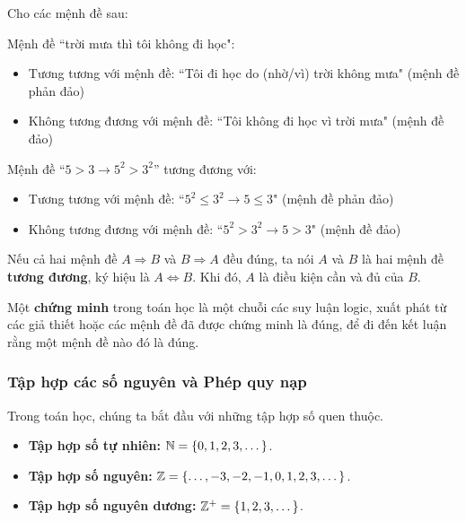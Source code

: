 \begin{example}
    Cho các mệnh đề sau:
    
    Mệnh đề ``trời mưa thì tôi không đi học":
    \begin{itemize}
        \item Tương tương với mệnh đề: ``Tôi đi học do (nhờ/vì) trời không mưa" (mệnh đề phản đảo)
        \item Không tương đương với mệnh đề: ``Tôi không đi học vì trời mưa" (mệnh đề đảo)
    \end{itemize}

    Mệnh đề ``$5 > 3 \rightarrow 5^2 > 3^2$'' tương đương với:
    \begin{itemize}
        \item Tương tương với mệnh đề: ``$5^2 \leq 3^2 \rightarrow 5 \leq 3$" (mệnh đề phản đảo)
        \item Không tương đương với mệnh đề: ``$5^2 > 3^2 \rightarrow 5 > 3$" (mệnh đề đảo)
    \end{itemize}
\end{example}

\begin{definition}
    Nếu cả hai mệnh đề $A \Rightarrow B$ và $B \Rightarrow A$ đều đúng, ta nói $A$ và $B$ là hai mệnh đề \textbf{tương đương}, ký hiệu là $A \iff B$. Khi đó, $A$ là điều kiện cần và đủ của $B$.
\end{definition}

\begin{definition}
    Một \textbf{chứng minh} trong toán học là một chuỗi các suy luận logic, xuất phát từ các giả thiết hoặc các mệnh đề đã được chứng minh là đúng, để đi đến kết luận rằng một mệnh đề nào đó là đúng.
\end{definition}

\subsubsection{Tập hợp các số nguyên và Phép quy nạp}

Trong toán học, chúng ta bắt đầu với những tập hợp số quen thuộc.
\begin{itemize}
    \item \textbf{Tập hợp số tự nhiên:} $\mathbb{N} = \{0, 1, 2, 3, \dots\}$.
    \item \textbf{Tập hợp số nguyên:} $\mathbb{Z} = \{\dots, -3, -2, -1, 0, 1, 2, 3, \dots\}$.
    \item \textbf{Tập hợp số nguyên dương:} $\mathbb{Z}^+ = \{1, 2, 3, \dots\}$.
\end{itemize}

